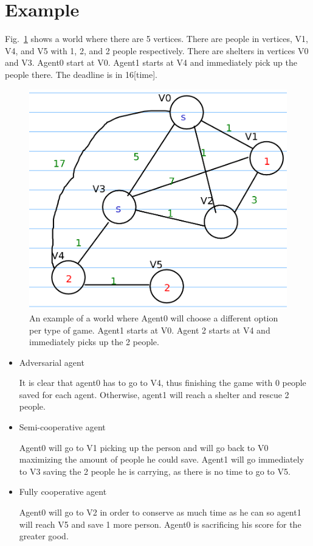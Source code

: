 \documentclass{article}                     %
\begin{document}
	\section{Example}
	Fig.~\ref{fig:worlddrawing} shows a world where there are 5 vertices. There are people in vertices, V1, V4, and V5 with 1, 2, and 2 people respectively. There are shelters in vertices V0 and V3. Agent0 start at V0. Agent1 starts at V4 and immediately pick up the people there. The deadline is in 16[time].
	\begin{figure}
		\centering
		\includegraphics[width=0.5\linewidth]{world_drawing}
		\caption{An example of a world where Agent0 will choose a different option per type of game. Agent1 starts at V0. Agent 2 starts at V4 and immediately picks up the 2 people.}
		\label{fig:worlddrawing}
	\end{figure}

	\begin{itemize}
		\item Adversarial agent
		
		It is clear that agent0 has to go to V4, thus finishing the game with 0 people saved for each agent. Otherwise, agent1 will reach a shelter and rescue 2 people.
		
		\item Semi-cooperative agent
		
		Agent0 will go to V1 picking up the person and will go back to V0 maximizing the amount of people he could save. Agent1 will go immediately to V3 saving the 2 people he is carrying, as there is no time to go to V5.
		
		\item Fully cooperative agent
		
		Agent0 will go to V2 in order to conserve as much time as he can so agent1 will reach V5 and save 1 more person. Agent0 is sacrificing his score for the greater good.
		
	\end{itemize}
\end{document}
